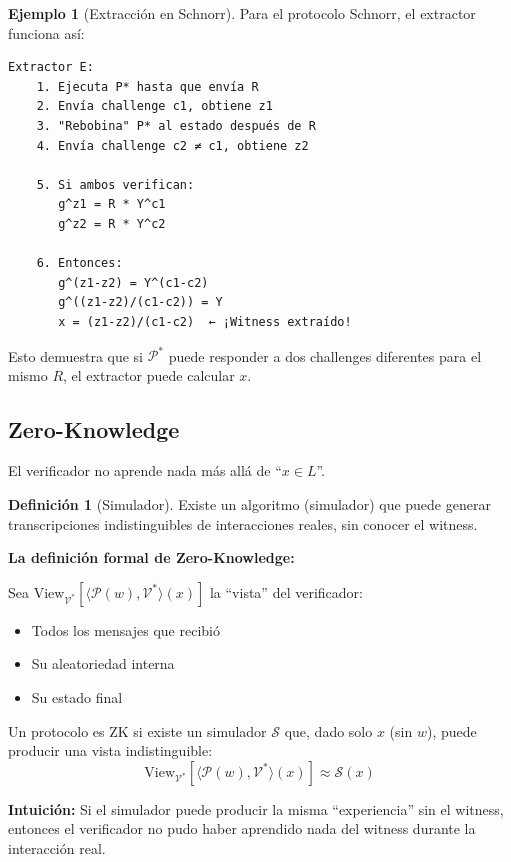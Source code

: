 \documentclass[11pt,a4paper,twoside,openright]{book}
\theoremstyle{definition}
\newtheorem{definition}{Definición}[chapter]
\newtheorem{example}{Ejemplo}[chapter]
\theoremstyle{plain}
\theoremstyle{remark}
\begin{document}
\begin{example}[Extracción en Schnorr]
Para el protocolo Schnorr, el extractor funciona así:

\begin{verbatim}
Extractor E:
    1. Ejecuta P* hasta que envía R
    2. Envía challenge c1, obtiene z1
    3. "Rebobina" P* al estado después de R
    4. Envía challenge c2 ≠ c1, obtiene z2
    
    5. Si ambos verifican:
       g^z1 = R * Y^c1
       g^z2 = R * Y^c2
       
    6. Entonces:
       g^(z1-z2) = Y^(c1-c2)
       g^((z1-z2)/(c1-c2)) = Y
       x = (z1-z2)/(c1-c2)  ← ¡Witness extraído!
\end{verbatim}

Esto demuestra que si $\mathcal{P}^*$ puede responder a dos challenges diferentes para el mismo $R$, el extractor puede calcular $x$.
\end{example}

\subsection{Zero-Knowledge}

El verificador no aprende nada más allá de ``$x \in L$''.

\begin{definition}[Simulador]
Existe un algoritmo (simulador) que puede generar transcripciones indistinguibles de interacciones reales, sin conocer el witness.
\end{definition}

\begin{mathnote}
\textbf{La definición formal de Zero-Knowledge:}

Sea $\text{View}_{\mathcal{V}^*}[\langle \mathcal{P}(w), \mathcal{V}^* \rangle(x)]$ la ``vista'' del verificador:
\begin{itemize}
    \item Todos los mensajes que recibió
    \item Su aleatoriedad interna
    \item Su estado final
\end{itemize}

Un protocolo es ZK si existe un simulador $\mathcal{S}$ que, dado solo $x$ (sin $w$), puede producir una vista indistinguible:
\[ \text{View}_{\mathcal{V}^*}[\langle \mathcal{P}(w), \mathcal{V}^* \rangle(x)] \approx \mathcal{S}(x) \]

\textbf{Intuición:} Si el simulador puede producir la misma ``experiencia'' sin el witness, entonces el verificador no pudo haber aprendido nada del witness durante la interacción real.
\end{mathnote}
\end{document}
